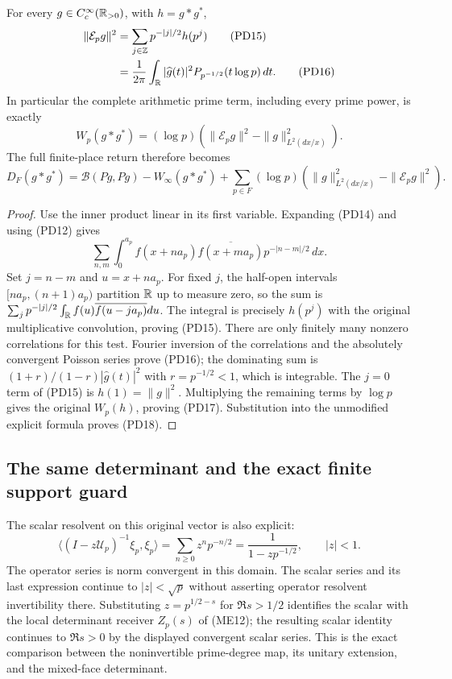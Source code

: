 \begin{theorem}
\label{thm:PD-Weil-energy}
For every $g\in C_c^\infty(\mathbb R_{>0})$, with $h=g*g^*$,
\begin{align}
 \|\mathcal E_pg\|^2
 &=\sum_{j\in\mathbb Z}p^{-|j|/2}h(p^j)\tag{PD15}\\
 &=\frac1{2\pi}\int_\mathbb R|\widehat g(t)|^2
 P_{p^{-1/2}}(t\log p)\,dt.\tag{PD16}
\end{align}
In particular the complete arithmetic prime term, including every prime
power, is exactly
\[
 W_p(g*g^*)=(\log p)
 \left(\|\mathcal E_pg\|^2-\|g\|_{L^2(dx/x)}^2\right).
 \tag{PD17}\label{eq:PD-prime-energy}
\]
The full finite-place return therefore becomes
\[
 D_F(g*g^*)=\mathscr B(Pg,Pg)-W_\infty(g*g^*)
 +\sum_{p\in F}(\log p)
 \left(\|g\|_{L^2(dx/x)}^2-\|\mathcal E_pg\|^2\right).
 \tag{PD18}\label{eq:PD-full-energy}
\]
\end{theorem}
\begin{proof}
Use the inner product linear in its first variable. Expanding (PD14)
and using (PD12) gives
\[
 \sum_{n,m}\int_0^{a_p}
 f(x+n a_p)\overline{f(x+m a_p)}p^{-|n-m|/2}\,dx.
\]
Set $j=n-m$ and $u=x+n a_p$. For fixed $j$, the half-open intervals
$[n a_p,(n+1)a_p)$ partition $\mathbb R$ up to measure zero, so the sum is
$\sum_jp^{-|j|/2}\int_\mathbb R f(u)\overline{f(u-j a_p)}du$.
The integral is precisely $h(p^j)$ with the original multiplicative
convolution, proving (PD15). There are only finitely many nonzero
correlations for this test. Fourier inversion of the correlations and
the absolutely convergent Poisson series prove (PD16); the dominating
sum is $(1+r)/(1-r)|\widehat g(t)|^2$ with $r=p^{-1/2}<1$,
which is integrable. The $j=0$ term of (PD15) is
$h(1)=\|g\|^2$. Multiplying the remaining terms by $\log p$
gives the original $W_p(h)$, proving (PD17). Substitution into the
unmodified explicit formula proves (PD18).
\end{proof}

\subsection{The same determinant and the exact finite support guard}
The scalar resolvent on this original vector is also explicit:
\[
 \langle (I-z\mathscr U_p)^{-1}\xi_p,\xi_p\rangle
 =\sum_{n\ge0}z^np^{-n/2}=
 \frac1{1-zp^{-1/2}},\qquad |z|<1.
 \tag{PD19}
\]
The operator series is norm convergent in this domain. The scalar series
and its last expression continue to $|z|<\sqrt p$ without asserting
operator resolvent invertibility there. Substituting
$z=p^{1/2-s}$ for $\Re s>1/2$ identifies the scalar with the local
determinant receiver $Z_p(s)$ of (ME12); the resulting scalar identity
continues to $\Re s>0$ by the displayed convergent scalar series.
This is the exact comparison between the noninvertible prime-degree
map, its unitary extension, and the mixed-face determinant.

